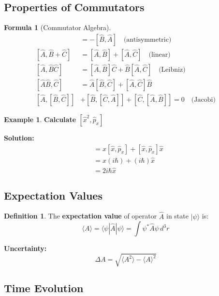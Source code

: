 \documentclass[12pt,a4paper]{article}
\theoremstyle{definition}
\newtheorem{definition}[theorem]{Definition}
\newtheorem{example}[theorem]{Example}
\newtheorem{formula}[theorem]{Formula}
\begin{document}
\subsection{Properties of Commutators}

\begin{formula}[Commutator Algebra]
\begin{align}
[\hat{A}, \hat{B}] &= -[\hat{B}, \hat{A}] \quad \text{(antisymmetric)} \\
[\hat{A}, \hat{B} + \hat{C}] &= [\hat{A}, \hat{B}] + [\hat{A}, \hat{C}] \quad \text{(linear)} \\
[\hat{A}, \hat{B}\hat{C}] &= [\hat{A}, \hat{B}]\hat{C} + \hat{B}[\hat{A}, \hat{C}] \quad \text{(Leibniz)} \\
[\hat{A}\hat{B}, \hat{C}] &= \hat{A}[\hat{B}, \hat{C}] + [\hat{A}, \hat{C}]\hat{B} \\
[\hat{A}, [\hat{B}, \hat{C}]] &+ [\hat{B}, [\hat{C}, \hat{A}]] + [\hat{C}, [\hat{A}, \hat{B}]] = 0 \quad \text{(Jacobi)}
\end{align}
\end{formula}

\begin{example}
\textbf{Calculate $[\hat{x}^2, \hat{p}_x]$}

\textbf{Solution:}
\begin{align*}
[\hat{x}^2, \hat{p}_x] &= \hat{x}[\hat{x}, \hat{p}_x] + [\hat{x}, \hat{p}_x]\hat{x} \\
&= \hat{x}(i\hbar) + (i\hbar)\hat{x} \\
&= 2i\hbar\hat{x}
\end{align*}
\end{example}

\subsection{Expectation Values}

\begin{definition}
The \textbf{expectation value} of operator $\hat{A}$ in state $|\psi\rangle$ is:
\[
\langle A\rangle = \langle\psi|\hat{A}|\psi\rangle = \int\psi^*\hat{A}\psi\,d^3r
\]

\textbf{Uncertainty:}
\[
\Delta A = \sqrt{\langle A^2\rangle - \langle A\rangle^2}
\]
\end{definition}

\subsection{Time Evolution}
\end{document}
